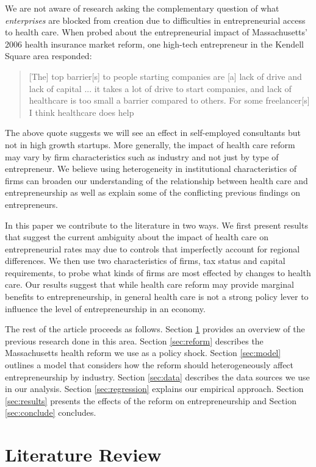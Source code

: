 \documentclass[12pt]{article}
\begin{document}
We are not aware of research asking the complementary question of what \emph{enterprises} are blocked from creation due to difficulties in entrepreneurial access to health care.  When probed about the entrepreneurial impact of Massachusetts' 2006 health insurance market reform, one high-tech entrepreneur in the Kendell Square area responded:
\begin{quote}
[The] top barrier[s] to people starting companies are [a] lack of drive and lack of capital ... it takes a lot of drive to start companies, and lack of healthcare is too small a barrier compared to others. For some freelancer[s] I think healthcare does help
\end{quote}
The above quote suggests we will see an effect in self-employed consultants but not in high growth startups. More generally, the impact of health care reform may vary by firm characteristics such as industry and not just by type of entrepreneur. We believe using heterogeneity in institutional characteristics of firms can broaden our understanding of the relationship between health care and entrepreneurship as well as explain some of the conflicting previous findings on entrepreneurs. 

In this paper we contribute to the literature in two ways. We first present results that suggest the current ambiguity about the impact of health care on entrepreneurial rates may due to controls that imperfectly account for regional differences. We then use two characteristics of firms, tax status and capital requirements, to probe what kinds of firms are most effected by changes to health care. Our results suggest that while health care reform may provide marginal benefits to entrepreneurship, in general health care is not a strong policy lever to influence the level of entrepreneurship in an economy.

The rest of the article proceeds as follows. Section \ref{sec:review} provides an overview of the previous research done in this area. Section \ref{sec:reform} describes the Massachusetts health reform we use as a policy shock. Section \ref{sec:model} outlines a model that considers how the reform should heterogeneously affect entrepreneurship by industry. Section \ref{sec:data} describes the data sources we use in our analysis. Section \ref{sec:regression} explains our empirical approach. Section \ref{sec:results} presents the effects of the reform on entrepreneurship and Section \ref{sec:conclude} concludes. 

\section{Literature Review}
\label{sec:review}
\end{document}
